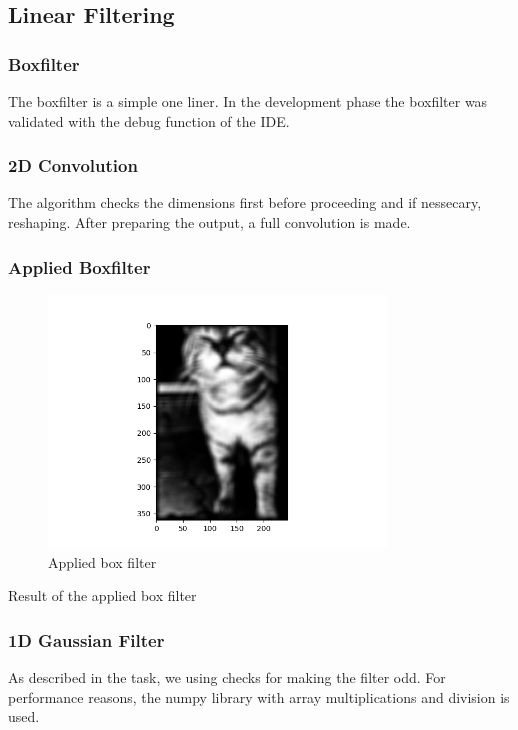 \documentclass[12pt]{article}
\begin{document}
\subsection{Linear Filtering}

\subsubsection{Boxfilter}
The boxfilter is a simple one liner. In the development phase the boxfilter was validated with the
debug function of the IDE.
\subsubsection{2D Convolution}
The algorithm checks the dimensions first before proceeding and if nessecary, reshaping. After preparing the output,
a full convolution is made.

\subsubsection{Applied Boxfilter}
\begin{figure}[!htb]
  \centering
  \includegraphics[width=0.8\textwidth]{pics/1_3_s}
  \caption{Applied box filter}
\end{figure}
Result of the applied box filter

\subsubsection{1D Gaussian Filter}
As described in the task, we using checks for making the filter odd. For performance reasons,
the numpy library with array multiplications and division is used.
\end{document}
